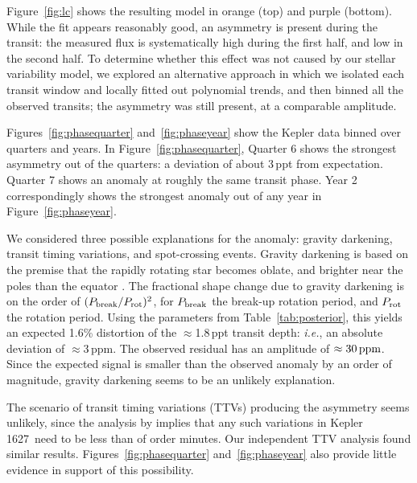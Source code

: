 \documentclass[12pt,modern,twocolumn,tighten]{aastex63}
\newcommand{\sn}{Kepler\,1627} %
\begin{document}
Figure~\ref{fig:lc} shows the resulting model in orange (top) and
purple (bottom).  While the fit appears reasonably good, an asymmetry
is present during the transit: the measured flux is systematically
high during the first half, and low in the second half.  To determine
whether this effect was not caused by our stellar variability model, we 
explored an alternative approach in which we isolated each transit
window and locally fitted out polynomial trends, and then binned all
the observed transits; the asymmetry was still present, at a
comparable amplitude.

Figures~\ref{fig:phasequarter} and~\ref{fig:phaseyear} show the
Kepler data binned over quarters and years.  In
Figure~\ref{fig:phasequarter}, Quarter 6 shows the strongest asymmetry
out of the quarters: a deviation of about 3\,ppt from
expectation.  Quarter 7 shows an anomaly at roughly the same transit
phase.  Year 2 correspondingly shows the strongest anomaly out of any
year in Figure~\ref{fig:phaseyear}.

We considered three possible explanations for the anomaly: gravity
darkening, transit timing variations, and spot-crossing events.
Gravity darkening is based on the premise that the rapidly rotating
star becomes oblate, and brighter near the poles than the equator
\citep[{\it e.g.},][]{masuda_spin-orbit_2015}.  The fractional shape
change due to gravity darkening is on the order of $(P_{\rm
break}/P_{\rm rot})^2$, for $P_{\rm break}$ the break-up rotation
period, and $P_{\rm rot}$ the rotation period.  Using the parameters
from Table~\ref{tab:posterior}, this yields an expected 1.6\%
distortion of the $\approx$1.8\,ppt transit depth: {\it i.e.}, an
absolute deviation of $\approx$3\,ppm.  The observed residual has an
amplitude of $\approx 30\,{\rm ppm}$.  Since the expected signal is
smaller than the observed anomaly by an order of magnitude, gravity
darkening seems to be an unlikely explanation.

The scenario of transit timing variations (TTVs) producing the
asymmetry seems unlikely, since the analysis by
\citet{holczer_transit_2016} implies that any such variations in \sn\
need to be less than of order minutes.  
Our independent TTV analysis found similar results.
Figures~\ref{fig:phasequarter}
and~\ref{fig:phaseyear} also provide little evidence in support of
this possibility.
\end{document}
